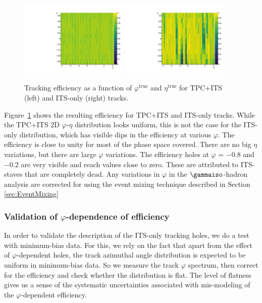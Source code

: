 \begin{figure}[h]
\center
\includegraphics[width=0.46\textwidth]{Data_Analysis/Tracking/etaPhi_eff_tpc.pdf}
\includegraphics[width=0.46\textwidth]{Data_Analysis/Tracking/etaPhi_eff_4layers.pdf}
\caption{Tracking efficiency as a function of $\varphi^{\mathrm{true}}$ and $\eta^{\mathrm{true}}$ for TPC+ITS (left) and ITS-only (right) tracks.}
\label{fig:2Defficiency}
\end{figure}

Figure~\ref{fig:2Defficiency} shows the resulting efficiency for TPC+ITS and ITS-only tracks. While the TPC+ITS 2D $\varphi$-$\eta$ distribution looks uniform, this is not the case for the ITS-only distribution, which has visible dips in the efficiency at various $\varphi$. The efficiency is close to unity for most of the phase space covered. There are no big $\eta$ variations, but there are large $\varphi$ variations. The efficiency holes at $\varphi$ = $-$0.8 and $-$0.2 are very visible and reach values close to zero. These are attributed to ITS-staves that are completely dead. Any variations in $\varphi$ in the $\gammaiso$-hadron analysis are corrected for using the event mixing technique described in Section \ref{sec:EventMixing}

\subsubsection{Validation of $\varphi$-dependence of efficiency}
\label{sec:phicheck}

In order to validate the description of the ITS-only tracking holes, we do a test with minimum-bias data. For this, we rely on the fact that apart from the effect of $\varphi$-dependent holes, the track azimuthal angle distribution is expected to be uniform in minimum-bias data. So we measure the track $\varphi$ spectrum, then correct for the efficiency and check whether the distribution is flat. The level of flatness gives us a sense of the systematic uncertainties associated with mis-modeling of the $\varphi$-dependent efficiency.

